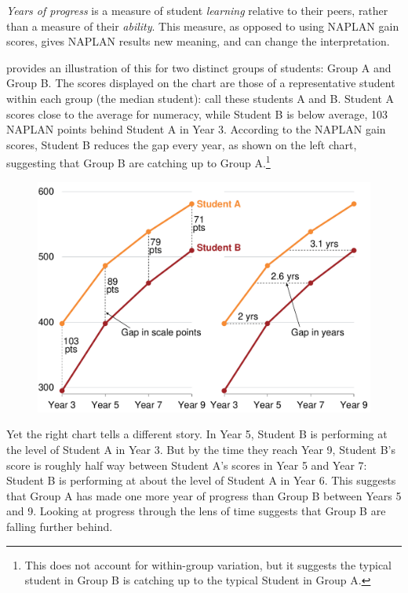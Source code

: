 \textit{Years of progress} is a measure of student \textit{learning} relative to their peers, rather than a measure of their \textit{ability}. This measure, as opposed to using NAPLAN gain scores, gives NAPLAN results new meaning, and can change the interpretation.

 provides an illustration of this for two distinct groups of students: Group A and Group B. The scores displayed on the chart are those of a representative student within each group (the median student): call these students A and B. Student A scores close to the average for numeracy, while Student B is below average, 103 NAPLAN points behind Student A in Year 3. According to the NAPLAN gain scores, Student B reduces the gap every year, as shown on the left chart, suggesting that Group B are catching up to Group A.\footnote{This does not account for within-group variation, but it suggests the typical student in Group B is catching up to the typical Student in Group A.}

\begin{figure}[t]
 \includegraphics[width=\columnwidth]{atlas/NSSvsY.pdf}\label{fig:example}

\end{figure}

Yet the right chart tells a different story. In Year 5, Student B is performing at the level of Student A in Year 3. But by the time they reach Year 9, Student B's score is roughly half way between Student A's scores in Year 5 and Year 7: Student B is performing at about the level of Student A in Year 6. This suggests that Group A has made one more year of progress than Group B between Years 5 and 9. Looking at progress through the lens of time suggests that Group B are falling further behind.

